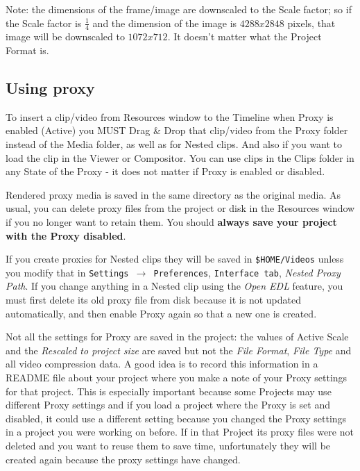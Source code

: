 Note: the dimensions of the frame/image are downscaled to the Scale factor; so if the Scale factor is $\frac{1}{4}$ and the dimension of the image is $4288x2848$ pixels, that image will be downscaled to $1072x712$. It doesn't matter what the Project Format is.

\subsection{Using proxy}%
\label{sub:using_proxy}

To insert a clip/video from Resources window to the Timeline when Proxy is enabled (Active) you MUST Drag \& Drop that clip/video from the Proxy folder instead of the Media folder, as well as for Nested clips. And also if you want to load the clip in the Viewer or Compositor. You can use clips in the Clips folder in any State of the Proxy - it does not matter if Proxy is enabled or disabled.

Rendered proxy media is saved in the same directory as the original media. As usual, you can delete proxy files from the project or disk in the Resources window if you no longer want to retain them. You should \textbf{always save your project with the Proxy disabled}.

If you create proxies for Nested clips they will be saved in \texttt{\$HOME/Videos} unless you modify that in \texttt{Settings $\rightarrow$ Preferences}, \texttt{Interface tab}, \textit{Nested Proxy Path}. If you change anything in a Nested clip using the \textit{Open EDL} feature, you must first delete its old proxy file from disk because it is not updated automatically, and then enable Proxy again so that a new one is created. 

Not all the settings for Proxy are saved in the project: the values of Active Scale and the \textit{Rescaled to project size} are saved but not the \textit{File Format}, \textit{File Type} and all video compression data. A good idea is to record this information in a README file about your project where you make a note of your Proxy settings for that project. 
This is especially important because some Projects may use different Proxy settings and
if you load a project where the Proxy is set and disabled, it could use a different
setting because you changed the Proxy settings in a project you were working on before.
If in that Project its proxy files were not deleted and you want to reuse them to save
time, unfortunately they will be created again because the proxy settings have changed.

